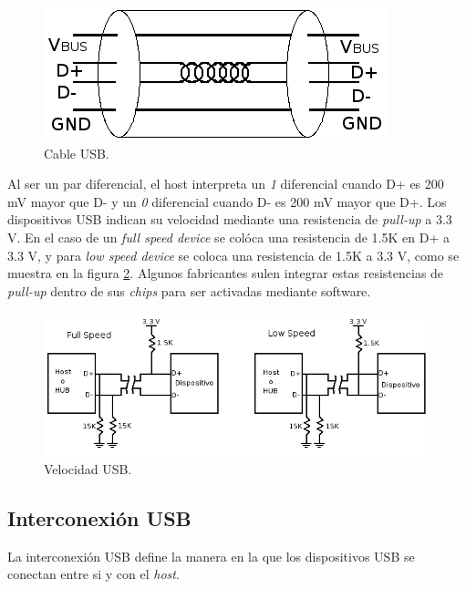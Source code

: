 \begin{figure}[htp]
\centering
\includegraphics[scale=0.5]{./img/electric_usb.png}
\caption{Cable USB.}
\label{fig:electric_usb}
\end{figure}

Al ser un par diferencial, el host interpreta un \emph{1} diferencial cuando D+
es 200 mV mayor que D- y un \emph{0} diferencial cuando D- es 200 mV mayor que
D+. 
Los dispositivos USB indican su velocidad mediante una resistencia de
\emph{pull-up} a 3.3 V. En el caso de un \emph{full speed device} se col\'oca
una resistencia de 1.5K en D+ a 3.3 V, y para \emph{low speed device} se coloca
una resistencia de 1.5K a 3.3 V, como se muestra en la figura
\ref{fig:electric_speed_usb}.
Algunos fabricantes sulen integrar estas resistencias de \emph{pull-up} dentro
de sus \emph{chips} para ser activadas mediante software.

\begin{figure}[htp]
\centering
\includegraphics[scale=0.5]{./img/electric_speed_usb.png}
\caption{Velocidad USB.}
\label{fig:electric_speed_usb}
\end{figure}


\subsection{Interconexi\'on USB}

La interconexi\'on USB define la manera en la que los dispositivos USB se
conectan entre si y con el \emph{host}. 

